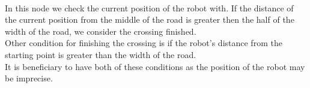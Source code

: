     \\
        In this node we check the current position of the robot with. If the distance of the current position from the middle of the road is greater then the half of the width of the road, we consider the crossing finished.\\
        Other condition for finishing the crossing is if the robot's distance from the starting point is greater than the width of the road.\\
        It is beneficiary to have both of these conditions as the position of the robot may be imprecise.
